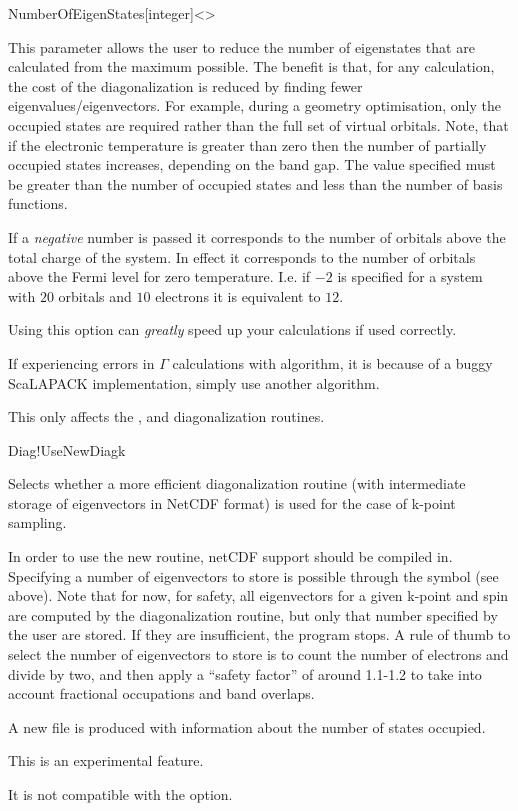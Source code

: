 \begin{fdfentry}{NumberOfEigenStates}[integer]<>

  This parameter allows the user to reduce the number of eigenstates
  that are calculated from the maximum possible. The benefit is that,
  for any calculation, the cost of the diagonalization is reduced by
  finding fewer eigenvalues/eigenvectors. For example, during a
  geometry optimisation, only the occupied states are required rather
  than the full set of virtual orbitals. Note, that if the electronic
  temperature is greater than zero then the number of partially
  occupied states increases, depending on the band gap. The value
  specified must be greater than the number of occupied states and
  less than the number of basis functions.

  If a \emph{negative} number is passed it corresponds to the number
  of orbitals above the total charge of the system. In effect it
  corresponds to the number of orbitals above the Fermi level for zero
  temperature. I.e. if $-2$ is specified for a system with $20$
  orbitals and $10$ electrons it is equivalent to $12$.

  Using this option can \emph{greatly} speed up your calculations if
  used correctly.

  \note If experiencing  errors in $\Gamma$
  calculations with  algorithm, it is because of a buggy
  ScaLAPACK implementation, simply use another algorithm.

  \note This only affects the ,  and
   diagonalization routines.
  
\end{fdfentry}


\begin{fdflogicalF}{Diag!UseNewDiagk}

  Selects whether a more efficient diagonalization routine (with
  intermediate storage of eigenvectors in NetCDF format) is used for
  the case of k-point sampling.

  In order to use the new routine, netCDF support should be compiled
  in.  Specifying a number of eigenvectors to store is possible
  through the symbol  (see above). Note that for
  now, for safety, all eigenvectors for a given k-point and spin are
  computed by the diagonalization routine, but only that number
  specified by the user are stored. If they are insufficient, the
  program stops.  A rule of thumb to select the number of eigenvectors
  to store is to count the number of electrons and divide by two, and
  then apply a ``safety factor'' of around 1.1-1.2 to take into account
  fractional occupations and band overlaps.

  A new file  is produced with information about the number
  of states occupied.

  This is an experimental feature. 

  \note It is not compatible with the 
  option.

\end{fdflogicalF}


